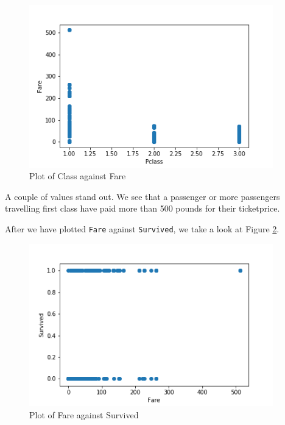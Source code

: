 \documentclass[11pt]{article}
\begin{document}
\begin{figure}[htbp]
\centering
\includegraphics[width=400px]{./PclassFare.png}
\caption{\label{tab:classfare}
Plot of Class against Fare}
\end{figure}

A couple of values stand out. We see that a passenger or more passengers travelling first class have paid more than 500 pounds for their ticketprice.

After we have plotted  \texttt{Fare} against \texttt{Survived}, we take a look at Figure \ref{tab:faresurvived}. 
\begin{figure}[htbp]
\centering
\includegraphics[width=400px]{./FareSurvived.png}
\caption{\label{tab:faresurvived}
Plot of Fare against Survived}
\end{figure}
\end{document}
